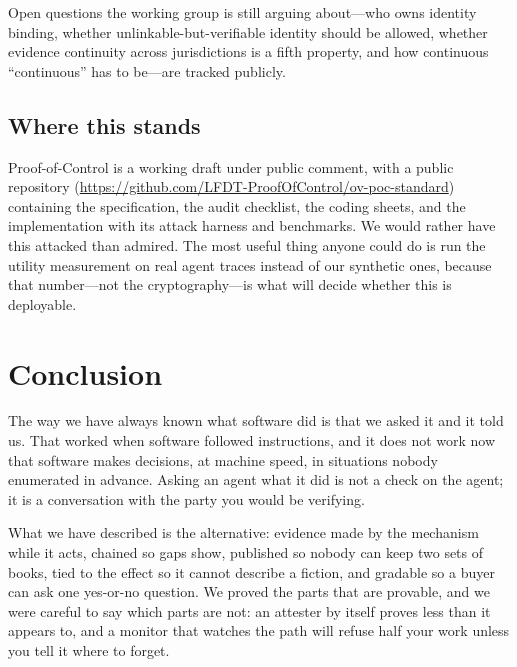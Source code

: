 \documentclass[11pt]{article}
\newcommand{\poc}{Proof-of-Control}
\begin{document}
Open questions the working group is still arguing about---who owns identity
binding, whether unlinkable-but-verifiable identity should be allowed, whether
evidence continuity across jurisdictions is a fifth property, and how
continuous ``continuous'' has to be---are tracked publicly.

\subsection{Where this stands}
\poc{} is a working draft under public comment, with a public repository
(\url{https://github.com/LFDT-ProofOfControl/ov-poc-standard}) containing the
specification, the audit checklist, the coding sheets, and the
implementation with its attack harness and benchmarks. We would rather have
this attacked than admired. The most useful thing anyone could do is run the
utility measurement on real agent traces instead of our synthetic ones,
because that number---not the cryptography---is what will decide whether this
is deployable.

\section{Conclusion}

The way we have always known what software did is that we asked it and it told
us. That worked when software followed instructions, and it does not work now
that software makes decisions, at machine speed, in situations nobody
enumerated in advance. Asking an agent what it did is not a check on the
agent; it is a conversation with the party you would be verifying.

What we have described is the alternative: evidence made by the mechanism
while it acts, chained so gaps show, published so nobody can keep two sets of
books, tied to the effect so it cannot describe a fiction, and gradable so a
buyer can ask one yes-or-no question. We proved the parts that are provable,
and we were careful to say which parts are not: an attester by itself proves
less than it appears to, and a monitor that watches the path will refuse half
your work unless you tell it where to forget.
\end{document}
